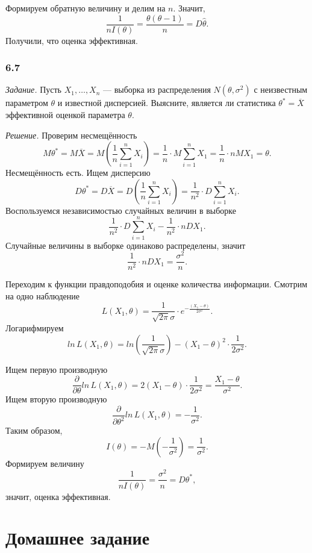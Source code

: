 Формируем обратную величину и делим на $n$.
Значит,
$$ \frac{1}{nI \left( \theta \right) } =
  \frac{ \theta \left( \theta - 1 \right) }{n} =
  D \hat{ \theta }.$$
Получили, что оценка эффективная.

\subsubsection*{6.7}

\textit{Задание.}
Пусть $X_1, \dotsc, X_n$ ---
выборка из распределения $N \left( \theta, \sigma^2 \right) $ с неизвестным параметром $ \theta $
и известной дисперсией.
Выясните,
является ли статистика $ \theta^* = \overline{X}$ эффективной оценкой параметра $ \theta $.

\textit{Решение.} Проверим несмещённость
$$M \theta^* =
  M \overline{X} =
  M \left( \frac{1}{n} \sum \limits_{i = 1}^n X_i \right) =
  \frac{1}{n} \cdot M \sum \limits_{i = 1}^n X_1 =
  \frac{1}{n} \cdot nMX_1 =
  \theta.$$
Несмещённость есть.
Ищем дисперсию
$$D \theta^* =
  D \overline{X} =
  D \left( \frac{1}{n} \sum \limits_{i = 1}^n X_i \right) =
  \frac{1}{n^2} \cdot D \sum \limits_{i = 1}^n X_i.$$
Воспользуемся независимостью случайных величин в выборке
$$ \frac{1}{n^2} \cdot D \sum \limits_{i = 1}^n X_i -
  \frac{1}{n^2} \cdot nDX_1.$$
Случайные величины в выборке одинаково распределены, значит
$$ \frac{1}{n^2} \cdot nDX_1 =
  \frac{ \sigma^2}{n}.$$

Переходим к функции правдоподобия и оценке количества информации.
Смотрим на одно наблюдение
$$L \left( X_1, \theta \right) =
  \frac{1}{ \sqrt{2 \pi } \sigma } \cdot e^{- \frac{ \left( X_1 - \theta \right) }{2 \sigma^2}}.$$
Логарифмируем
$$ln \, L \left( X_1, \theta \right) =
  ln \left( \frac{1}{ \sqrt{2 \pi } \sigma } \right) -
  \left( X_1 - \theta \right)^2 \cdot \frac{1}{2 \sigma^2}.$$

Ищем первую производную
$$ \frac{ \partial }{ \partial \theta } ln \, L \left( X_1, \theta \right) =
  2 \left( X_1 - \theta \right) \cdot \frac{1}{2 \sigma^2} =
  \frac{X_1 - \theta }{ \sigma^2}.$$
Ищем вторую производную
$$ \frac{ \partial }{ \partial \theta^2} ln \, L \left( X_1, \theta \right) =
  - \frac{1}{ \sigma^2}.$$
Таким образом,
$$I \left( \theta \right) =
  -M \left( - \frac{1}{ \sigma^2} \right) =
  \frac{1}{ \sigma^2}.$$
Формируем величину
$$ \frac{1}{nI \left( \theta \right) } =
  \frac{ \sigma^2}{n} =
  D \theta^*,$$
значит, оценка эффективная.

\section*{Домашнее задание}

